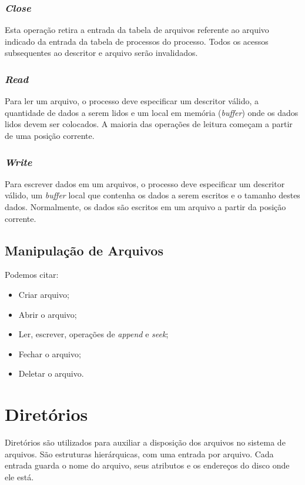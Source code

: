 \subsubsection{\textit{Close}}
Esta operação retira a entrada da tabela de arquivos referente ao arquivo indicado da entrada da tabela de processos do processo. Todos os acessos subsequentes ao descritor e arquivo serão invalidados.


\subsubsection{\textit{Read}}
Para ler um arquivo, o processo deve especificar um descritor válido, a quantidade de dados a serem lidos e um local em memória (\textit{buffer}) onde os dados lidos devem ser colocados. A maioria das operações de leitura começam a partir de uma posição corrente.

\subsubsection{\textit{Write}}
Para escrever dados em um arquivos, o processo deve especificar um descritor válido, um \textit{buffer} local que contenha os dados a serem escritos e o tamanho destes dados. Normalmente, os dados são escritos em um arquivo a partir da posição corrente.

\subsection{Manipulação de Arquivos}
Podemos citar:
\begin{itemize}
  \item Criar arquivo;
  \item Abrir o arquivo;
  \item Ler, escrever, operações de \textit{append} e \textit{seek};
  \item Fechar o arquivo;
  \item Deletar o arquivo.
\end{itemize}










\section{Diretórios}
Diretórios são utilizados para auxiliar a disposição dos arquivos no sistema de arquivos. São estruturas hierárquicas, com uma entrada por arquivo. Cada entrada guarda o nome do arquivo, seus atributos e os endereços do disco onde ele está.







